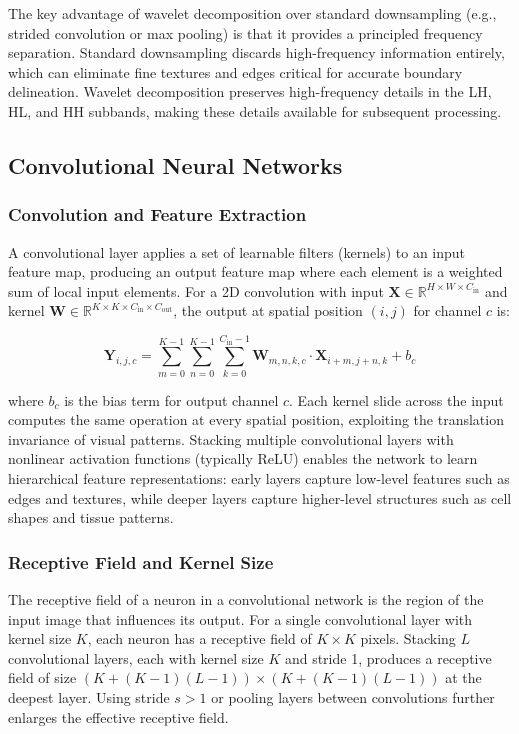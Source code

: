 The key advantage of wavelet decomposition over standard downsampling (e.g., strided convolution or max pooling) is that it provides a principled frequency separation. Standard downsampling discards high-frequency information entirely, which can eliminate fine textures and edges critical for accurate boundary delineation. Wavelet decomposition preserves high-frequency details in the LH, HL, and HH subbands, making these details available for subsequent processing.

\subsection{Convolutional Neural Networks}

\subsubsection{Convolution and Feature Extraction}

A convolutional layer applies a set of learnable filters (kernels) to an input feature map, producing an output feature map where each element is a weighted sum of local input elements. For a 2D convolution with input $\mathbf{X} \in \mathbb{R}^{H \times W \times C_{\text{in}}}$ and kernel $\mathbf{W} \in \mathbb{R}^{K \times K \times C_{\text{in}} \times C_{\text{out}}}$, the output at spatial position $(i,j)$ for channel $c$ is:

\begin{equation}
	\mathbf{Y}_{i,j,c} = \sum_{m=0}^{K-1} \sum_{n=0}^{K-1} \sum_{k=0}^{C_{\text{in}}-1} \mathbf{W}_{m,n,k,c} \cdot \mathbf{X}_{i+m, j+n, k} + b_c
\end{equation}

where $b_c$ is the bias term for output channel $c$. Each kernel slide across the input computes the same operation at every spatial position, exploiting the translation invariance of visual patterns. Stacking multiple convolutional layers with nonlinear activation functions (typically ReLU) enables the network to learn hierarchical feature representations: early layers capture low-level features such as edges and textures, while deeper layers capture higher-level structures such as cell shapes and tissue patterns.

\subsubsection{Receptive Field and Kernel Size}

The receptive field of a neuron in a convolutional network is the region of the input image that influences its output. For a single convolutional layer with kernel size $K$, each neuron has a receptive field of $K \times K$ pixels. Stacking $L$ convolutional layers, each with kernel size $K$ and stride 1, produces a receptive field of size $(K + (K-1)(L-1)) \times (K + (K-1)(L-1))$ at the deepest layer. Using stride $s > 1$ or pooling layers between convolutions further enlarges the effective receptive field.

